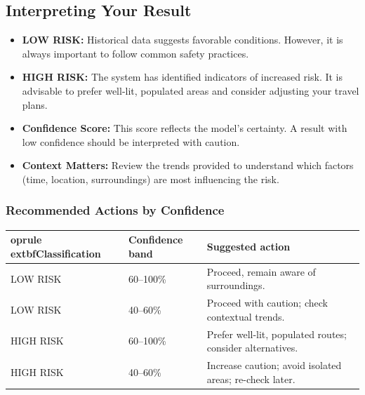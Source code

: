 \documentclass[11pt]{article}
\begin{document}
\subsection{Interpreting Your Result}
\begin{itemize}[leftmargin=*]
\item \textbf{LOW RISK:} Historical data suggests favorable conditions. However, it is always important to follow common safety practices.
\item \textbf{HIGH RISK:} The system has identified indicators of increased risk. It is advisable to prefer well-lit, populated areas and consider adjusting your travel plans.
\item \textbf{Confidence Score:} This score reflects the model's certainty. A result with low confidence should be interpreted with caution.
\item \textbf{Context Matters:} Review the trends provided to understand which factors (time, location, surroundings) are most influencing the risk.
\end{itemize}

\subsubsection*{Recommended Actions by Confidence}
\begin{center}
\begin{tabular}{@{}lll@{}}
	oprule
	extbf{Classification} & \textbf{Confidence band} & \textbf{Suggested action} \\
\midrule
LOW RISK  & 60--100\% & Proceed, remain aware of surroundings. \\
LOW RISK  & 40--60\%  & Proceed with caution; check contextual trends. \\
HIGH RISK & 60--100\% & Prefer well-lit, populated routes; consider alternatives. \\
HIGH RISK & 40--60\%  & Increase caution; avoid isolated areas; re-check later. \\
\bottomrule
\end{tabular}
\end{center}
\end{document}
